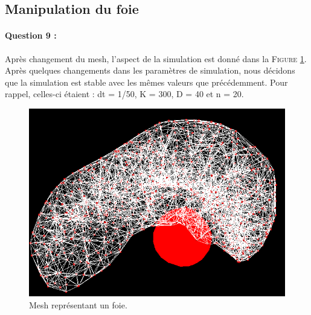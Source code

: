 \documentclass[a4paper,12pt]{article}
\begin{document}
\subsection{Manipulation du foie}
\paragraph{Question 9 :} Après changement du mesh, l'aspect de la simulation est donné dans la \textsc{Figure} \ref{fig:liver}. Après quelques changements dans les paramètres de simulation, nous décidons que la simulation est stable avec les mêmes valeurs que précédemment. Pour rappel, celles-ci étaient : dt = 1/50, K = 300, D = 40 et n = 20.
\begin{figure}[ht!]
  \centering
  \includegraphics[width=\textwidth]{images/foie.png}
  \caption{Mesh représentant un foie.}
  \label{fig:liver}
\end{figure}
\end{document}
